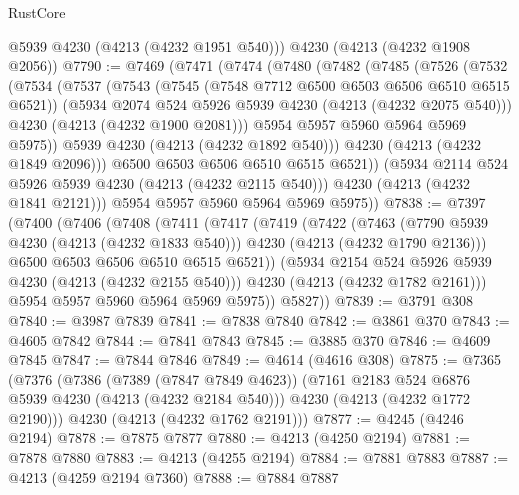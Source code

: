 \begin{lexlean}{RustCore}
\begin{coremodule}
      @5939
      @4230
      (@4213 (@4232 @1951 @540)))
    @4230
    (@4213 (@4232 @1908 @2056))
@7790 := @7469
    (@7471
      (@7474
        (@7480
          (@7482
            (@7485
              (@7526
                (@7532
                  (@7534
                    (@7537
                      (@7543
                        (@7545 (@7548 @7712 @6500 @6503 @6506 @6510 @6515 @6521))
                        (@5934 @2074 @524 @5926 @5939 @4230 (@4213 (@4232 @2075 @540)))
                        @4230
                        (@4213 (@4232 @1900 @2081)))
                      @5954
                      @5957
                      @5960
                      @5964
                      @5969
                      @5975))
                  @5939
                  @4230
                  (@4213 (@4232 @1892 @540)))
                @4230
                (@4213 (@4232 @1849 @2096)))
              @6500
              @6503
              @6506
              @6510
              @6515
              @6521))
          (@5934 @2114 @524 @5926 @5939 @4230 (@4213 (@4232 @2115 @540)))
          @4230
          (@4213 (@4232 @1841 @2121)))
        @5954
        @5957
        @5960
        @5964
        @5969
        @5975))
@7838 := @7397
    (@7400
      (@7406
        (@7408
          (@7411
            (@7417
              (@7419
                (@7422
                  (@7463
                    (@7790 @5939 @4230 (@4213 (@4232 @1833 @540)))
                    @4230
                    (@4213 (@4232 @1790 @2136)))
                  @6500
                  @6503
                  @6506
                  @6510
                  @6515
                  @6521))
              (@5934 @2154 @524 @5926 @5939 @4230 (@4213 (@4232 @2155 @540)))
              @4230
              (@4213 (@4232 @1782 @2161)))
            @5954
            @5957
            @5960
            @5964
            @5969
            @5975))
        @5827))
@7839 := @3791 @308
@7840 := @3987 @7839
@7841 := @7838 @7840
@7842 := @3861 @370
@7843 := @4605 @7842
@7844 := @7841 @7843
@7845 := @3885 @370
@7846 := @4609 @7845
@7847 := @7844 @7846
@7849 := @4614 (@4616 @308)
@7875 := @7365
    (@7376
      (@7386
        (@7389 (@7847 @7849 @4623))
        (@7161 @2183 @524 @6876 @5939 @4230 (@4213 (@4232 @2184 @540)))
        @4230
        (@4213 (@4232 @1772 @2190)))
      @4230
      (@4213 (@4232 @1762 @2191)))
@7877 := @4245 (@4246 @2194)
@7878 := @7875 @7877
@7880 := @4213 (@4250 @2194)
@7881 := @7878 @7880
@7883 := @4213 (@4255 @2194)
@7884 := @7881 @7883
@7887 := @4213 (@4259 @2194 @7360)
@7888 := @7884 @7887

\end{coremodule}
\end{lexlean}
